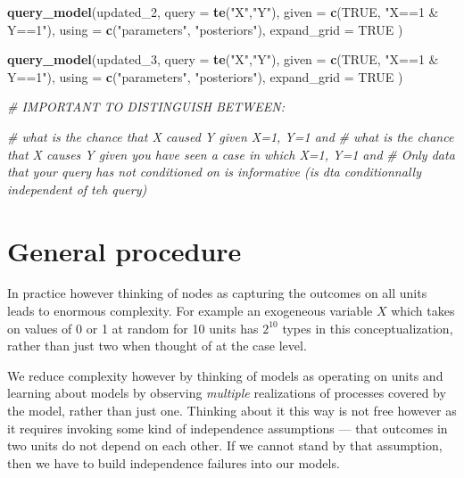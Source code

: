 \documentclass[
  12pt,
]{book}
\newenvironment{Shaded}{\begin{snugshade}}{\end{snugshade}}
\newcommand{\CommentTok}[1]{\textcolor[rgb]{0.56,0.35,0.01}{\textit{#1}}}
\newcommand{\DataTypeTok}[1]{\textcolor[rgb]{0.13,0.29,0.53}{#1}}
\newcommand{\DecValTok}[1]{\textcolor[rgb]{0.00,0.00,0.81}{#1}}
\newcommand{\KeywordTok}[1]{\textcolor[rgb]{0.13,0.29,0.53}{\textbf{#1}}}
\newcommand{\NormalTok}[1]{#1}
\newcommand{\OtherTok}[1]{\textcolor[rgb]{0.56,0.35,0.01}{#1}}
\newcommand{\StringTok}[1]{\textcolor[rgb]{0.31,0.60,0.02}{#1}}
\begin{document}
\begin{Shaded}
\begin{Highlighting}[]
\KeywordTok{query_model}\NormalTok{(updated_}\DecValTok{2}\NormalTok{, }
                        \DataTypeTok{query =} \KeywordTok{te}\NormalTok{(}\StringTok{"X"}\NormalTok{,}\StringTok{"Y"}\NormalTok{), }
                        \DataTypeTok{given =} \KeywordTok{c}\NormalTok{(}\OtherTok{TRUE}\NormalTok{, }\StringTok{"X==1 & Y==1"}\NormalTok{), }
                        \DataTypeTok{using =} \KeywordTok{c}\NormalTok{(}\StringTok{"parameters"}\NormalTok{, }\StringTok{"posteriors"}\NormalTok{), }
                        \DataTypeTok{expand_grid =} \OtherTok{TRUE}\NormalTok{ )}

\KeywordTok{query_model}\NormalTok{(updated_}\DecValTok{3}\NormalTok{, }
                        \DataTypeTok{query =} \KeywordTok{te}\NormalTok{(}\StringTok{"X"}\NormalTok{,}\StringTok{"Y"}\NormalTok{), }
                        \DataTypeTok{given =} \KeywordTok{c}\NormalTok{(}\OtherTok{TRUE}\NormalTok{, }\StringTok{"X==1 & Y==1"}\NormalTok{), }
                        \DataTypeTok{using =} \KeywordTok{c}\NormalTok{(}\StringTok{"parameters"}\NormalTok{, }\StringTok{"posteriors"}\NormalTok{), }
                        \DataTypeTok{expand_grid =} \OtherTok{TRUE}\NormalTok{ )}


\CommentTok{# IMPORTANT TO DISTINGUISH BETWEEN:}

\CommentTok{# what is the chance that X caused Y given X=1, Y=1 and}
\CommentTok{# what is the chance that X causes Y given you have seen a case in which X=1, Y=1 and}
\CommentTok{# Only data that your query has not conditioned on is informative (is dta conditionnally independent of teh query)}
\end{Highlighting}
\end{Shaded}

\hypertarget{general-procedure}{%
\section{General procedure}\label{general-procedure}}

In practice however thinking of nodes as capturing the outcomes on all units leads to enormous complexity. For example an exogeneous variable \(X\) which takes on values of 0 or 1 at random for 10 units has \(2^{10}\) types in this conceptualization, rather than just two when thought of at the case level.

We reduce complexity however by thinking of models as operating on units and learning about models by observing \emph{multiple} realizations of processes covered by the model, rather than just one. Thinking about it this way is not free however as it requires invoking some kind of independence assumptions --- that outcomes in two units do not depend on each other. If we cannot stand by that assumption, then we have to build independence failures into our models.
\end{document}

